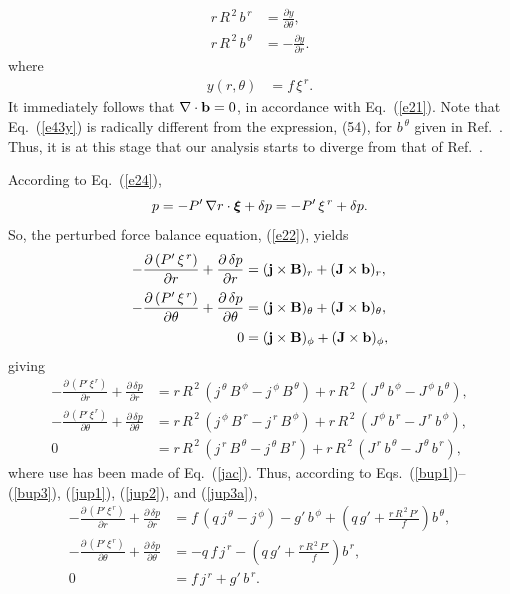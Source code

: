 \documentclass[12pt,prb,aps]{revtex4-1}
\newcommand {\bxi}{\mbox{\boldmath$\xi$}}
\begin{document}
\begin{align}\label{e41}
r\,R^{\,2}\,b^{\,r}& = \frac{\partial y}{\partial\theta},\\[0.5ex]
r\,R^{\,2}\,b^{\,\theta} &= - \frac{\partial y}{\partial r}.\label{e43y}
\end{align}
where 
\begin{align}\label{e42}
y(r,\theta) &=f\,\xi^{\,r}.
\end{align}
It immediately follows that $\nabla\cdot{\bf b} =0$, in accordance with  Eq.~(\ref{e21}). 
Note that Eq.~(\ref{e43y}) is radically different from the expression, (54), for $b^{\,\theta}$ given in Ref.~. Thus, it is at this stage that our analysis
starts to diverge from that of Ref.~.

According to Eq.~(\ref{e24}), 
\begin{equation}
p =-P'\,\nabla r\cdot\bxi+\delta p=- P'\,\xi^{\,r}+ \delta p.
\end{equation}
So, the perturbed force balance equation, (\ref{e22}), yields\,\cite{tj}
\begin{align}
-\frac{\partial\, (P'\,\xi^{\,r})}{\partial r}  +\frac{\partial\,\delta p}{\partial r}&= ({\bf j}\times {\bf B})_r+({\bf J}\times {\bf b})_r,\\[0.5ex]
-\frac{\partial\,(P'\,\xi^{\,r})}{\partial \theta} +\frac{\partial\,\delta p}{\partial \theta}&= ({\bf j}\times {\bf B})_\theta+({\bf J}\times {\bf b})_\theta,\\[0.5ex]
0&= ({\bf j}\times {\bf B})_\phi+({\bf J}\times {\bf b})_\phi,
\end{align}
giving\,\cite{tj}
\begin{align}
-\frac{\partial\, (P'\,\xi^{\,r})}{\partial r}+\frac{\partial\,\delta p}{\partial r} &=r\,R^{\,2}\,(j^{\,\theta}\,B^{\,\phi}-j^{\,\phi}\,B^{\,\theta}) + r\,R^{\,2}\,(J^{\,\theta}\,b^{\,\phi}-J^{\,\phi}\,b^{\,\theta}),\\[0.5ex]
-\frac{\partial\,(P'\,\xi^{\,r})}{\partial \theta} +\frac{\partial\,\delta p}{\partial \theta}&=r\,R^{\,2}\,(j^{\,\phi}\,B^{\,r}-j^{\,r}\,B^{\,\phi}) + r\,R^{\,2}\,(J^{\,\phi}\,b^{\,r}-J^{\,r}\,b^{\,\phi}),\\[0.5ex]
0&=r\,R^{\,2}\,(j^{\,r}\,B^{\,\theta}-j^{\,\theta}\,B^{\,r}) + r\,R^{\,2}\,(J^{\,r}\,b^{\,\theta}-J^{\,\theta}\,b^{\,r}),
\end{align}
where use has been made of Eq.~(\ref{jac}). 
Thus, according to Eqs.~(\ref{bup1})--(\ref{bup3}), (\ref{jup1}), (\ref{jup2}), and (\ref{jup3a}), 
\begin{align}
-\frac{\partial\, (P'\,\xi^{\,r})}{\partial r}  +\frac{\partial\,\delta p}{\partial r}&= f\,(q\,j^{\,\theta} -j^{\,\phi}) - g'\,b^{\,\phi} + \left(q\,g'+\frac{r\,R^{\,2}\,P'}{f}\right)b^{\,\theta},\label{e51}\\[0.5ex]
-\frac{\partial\,(P'\,\xi^{\,r})}{\partial \theta} +\frac{\partial\,\delta p}{\partial \theta}&=-q\,f\,j^{\,r} - \left(q\,g'+\frac{r\,R^{\,2}\,P'}{f}\right)b^{\,r},\label{e44}\\[0.5ex]
0&= f\,j^{\,r}+g'\,b^{\,r}.\label{e53}
\end{align}
\end{document}
